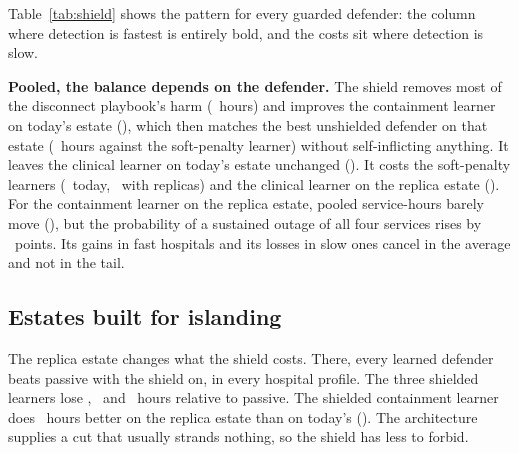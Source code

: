Table~\ref{tab:shield} shows the pattern for every guarded defender: the
column where detection is fastest is entirely bold, and the costs sit where
detection is slow.

\textbf{Pooled, the balance depends on the defender.} The shield removes
most of the disconnect playbook's harm (\numShieldDisconnectHoursCi\ hours)
and improves the containment learner on today's estate
(\numShieldQContainmentTodayHoursCi), which then matches the best
unshielded defender on that estate
(\numKeyQSoftTodayToQContainmentTodayShieldedHoursCi\ hours against the
soft-penalty learner) without self-inflicting anything. It leaves the
clinical learner on today's estate unchanged
(\numShieldQClinicalTodayHoursCi). It costs the soft-penalty learners
(\numShieldQSoftTodayHoursCi\ today, \numShieldQSoftReplicasHoursCi\ with
replicas) and the clinical learner on the replica estate
(\numShieldQClinicalReplicasHoursCi). For the containment learner on the
replica estate, pooled service-hours barely move
(\numShieldQContainmentReplicasHoursCi), but the probability of a sustained
outage of all four services rises by
\numShieldQContainmentReplicasKfourCi\ points. Its gains in fast hospitals
and its losses in slow ones cancel in the average and not in the tail.

\subsection{Estates built for islanding}

The replica estate changes what the shield costs. There, every learned
defender beats passive with the shield on, in every hospital profile. The
three shielded learners lose \numVsQSoftReplicasShieldedHoursCi,
\numVsQContainmentReplicasShieldedHoursCi\ and
\numVsQClinicalReplicasShieldedHoursCi\ hours relative to passive. The
shielded containment learner does \numKeyQContainmentTodayShieldedToQContainmentReplicasShieldedHoursAbs\
hours better on the replica estate than on today's
(\numKeyQContainmentTodayShieldedToQContainmentReplicasShieldedHoursCi). The
architecture supplies a cut that usually strands nothing, so the shield has
less to forbid.
